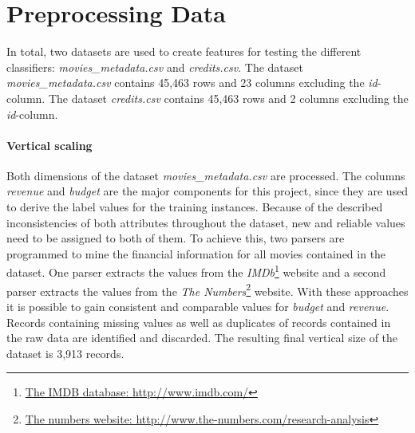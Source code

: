 \section{Preprocessing Data}
\label{cha:preprocessing}

In total, two datasets are used to create features for testing the different classifiers:
\textit{movies\_metadata.csv} and \textit{credits.csv}. The dataset \textit{movies\_metadata.csv} contains 45,463 rows and 23 columns excluding the \textit{id}-column. The dataset \textit{credits.csv} contains 45,463 rows and 2 columns excluding the \textit{id}-column.

\paragraph{Vertical scaling}
Both dimensions of the dataset \textit{movies\_metadata.csv} are processed. 
The columns \textit{revenue} and \textit{budget} are the major components for this project, since they are used to derive the label values for the training instances. Because of the described inconsistencies of both attributes throughout the dataset, new and reliable values need to be assigned to both of them. To achieve this, two parsers are programmed to mine the financial information for all movies contained in the dataset. One parser extracts the values from the \textit{IMDb}\footnote{\hyperref{http://www.imdb.com/}{external_sources}{ref:IMDB}{The IMDB database: http://www.imdb.com/}} website and a second parser extracts the values from the \textit{The Numbers}\footnote{\hyperref{http://www.the-numbers.com/research-analysis}{external_sources}{ref:numbers}{The numbers website: http://www.the-numbers.com/research-analysis}} website. With these approaches it is possible to gain consistent and comparable values for \textit{budget} and \textit{revenue}. Records containing missing values as well as duplicates of records contained in the raw data are identified and discarded. The resulting final vertical size of the dataset is 3,913 records.

 

